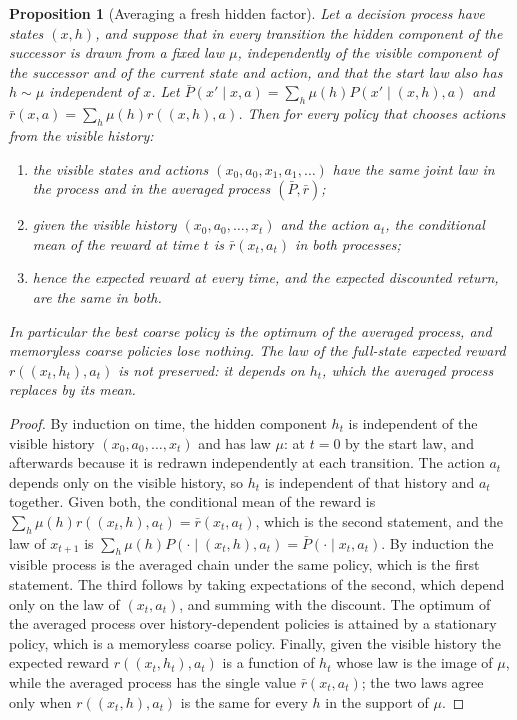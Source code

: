 \documentclass[11pt]{article}
\theoremstyle{definition}
\theoremstyle{plain}
\newtheorem{proposition}[definition]{Proposition}
\begin{document}
\begin{proposition}[Averaging a fresh hidden factor]\label{prop:fresh}
Let a decision process have states $(x,h)$, and suppose that in every transition the hidden component
of the successor is drawn from a fixed law $\mu$, independently of the visible component of the
successor and of the current state and action, and that the start law also has $h\sim\mu$ independent
of $x$. Let $\bar P(x'\mid x,a)=\sum_h\mu(h)P(x'\mid(x,h),a)$ and $\bar r(x,a)=\sum_h\mu(h)r((x,h),a)$.
Then for every policy that chooses actions from the visible history:
\begin{enumerate}
\item the visible states and actions $(x_0,a_0,x_1,a_1,\dots)$ have the same joint law in the process
and in the averaged process $(\bar P,\bar r)$;
\item given the visible history $(x_0,a_0,\dots,x_t)$ and the action $a_t$, the conditional mean of the
reward at time $t$ is $\bar r(x_t,a_t)$ in both processes;
\item hence the expected reward at every time, and the expected discounted return, are the same in
both.
\end{enumerate}
In particular the best coarse policy is the optimum of the averaged process, and memoryless coarse
policies lose nothing. The law of the full-state expected reward $r((x_t,h_t),a_t)$ is not
preserved: it depends on $h_t$, which the averaged process replaces by its mean.
\end{proposition}

\begin{proof}
By induction on time, the hidden component $h_t$ is independent of the visible history
$(x_0,a_0,\dots,x_t)$ and has law $\mu$: at $t=0$ by the start law, and afterwards because it is
redrawn independently at each transition. The action $a_t$ depends only on the visible history, so
$h_t$ is independent of that history and $a_t$ together. Given both, the conditional mean of the
reward is $\sum_h\mu(h)r((x_t,h),a_t)=\bar r(x_t,a_t)$, which is the second statement, and the law of
$x_{t+1}$ is $\sum_h\mu(h)P(\cdot\mid(x_t,h),a_t)=\bar P(\cdot\mid x_t,a_t)$. By induction the visible
process is the averaged chain under the same policy, which is the first statement. The third follows
by taking expectations of the second, which depend only on the law of $(x_t,a_t)$, and summing with
the discount. The optimum of the averaged process over history-dependent policies is attained by a
stationary policy, which is a memoryless coarse policy. Finally, given the visible history the
expected reward $r((x_t,h_t),a_t)$ is a function of $h_t$ whose law is the image of $\mu$, while the
averaged process has the single value $\bar r(x_t,a_t)$; the two laws agree only when
$r((x_t,h),a_t)$ is the same for every $h$ in the support of $\mu$.
\end{proof}
\end{document}
